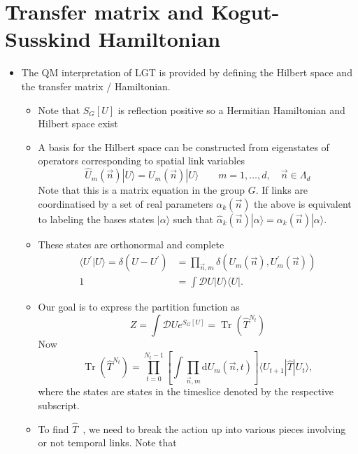 \section{Transfer matrix and Kogut-Susskind Hamiltonian}

\begin{itemize}
  \item The QM interpretation of LGT is provided by defining the Hilbert space and the transfer matrix / Hamiltonian.
  \begin{itemize}
      \item Note that $S_G[U]$ is reflection positive so a Hermitian Hamiltonian and Hilbert space exist
      \item A basis for the Hilbert space can be constructed from eigenstates of operators corresponding to spatial link variables
      \begin{equation}
          \hat{U}_m(\vec{n})|U\rangle = U_m(\vec{n})|U\rangle \qquad m = 1,\ldots, d, \quad \vec{n}\in\Lambda_d
      \end{equation}
      Note that this is a matrix equation in the group $G$. If links are coordinatised by a set of real parameters $\alpha_k(\vec{n})$ the above is equivalent to labeling the bases states $|\alpha\rangle$ such that $\hat{\alpha}_k(\vec{n})|\alpha\rangle = \alpha_k(\vec{n}) |\alpha\rangle$.
      \item These states are orthonormal and complete
      \begin{align}
          \langle U^\prime|U\rangle = \delta(U - U^\prime) &= \prod_{\vec{n}, m}\delta(U_m(\vec{n}),U^\prime_m(\vec{n})) \nonumber \\
          1 &= \int\mathcal{D}U |U\rangle \langle U |.
      \end{align}
      \item Our goal is to express the partition function as
      \begin{equation}
      Z = \int \mathcal{D}U e^{S_G[U]} = \operatorname{Tr}(\hat{T}^{N_t})
      \end{equation}
      Now
      \begin{equation}
          \operatorname{Tr}(\hat{T}^{N_t}) = \prod_{t=0}^{N_t - 1}\left[\int \prod_{\vec{n}, m}\text{d}U_m(\vec{n},t)\right]\langle U_{t+1}| \hat{T} | U_t \rangle,
      \end{equation}
      where the states are states in the timeslice denoted by the respective subscript.
      \item To find $\hat{T}$ , we need to break the action up into various pieces involving or not temporal links. Note that

\end{itemize}
\end{itemize}
